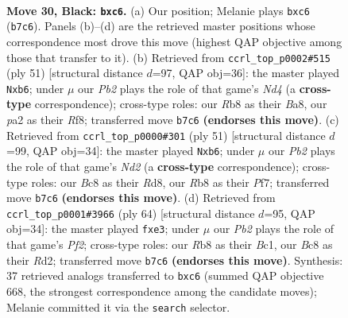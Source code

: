 \documentclass[11pt]{article}
\begin{document}
\clearpage

\begin{figure}[p]\centering
\begin{subfigure}{0.46\textwidth}\centering
\resizebox{\linewidth}{!}{%
\newchessgame
\chessboard[
  setfen={1rbb3k/pp5p/2Q1BppB/8/5P1P/3P1N2/PPP2PK1/4R3 b - - 0 30},
  showmover=false,
  pgfstyle=straightmove, color=movearrow, markmove={b7-c6}
]}
\caption{}
\end{subfigure}\hfill
\begin{subfigure}{0.46\textwidth}\centering
\resizebox{\linewidth}{!}{%
\newchessgame
\chessboard[
  setfen={b4rk1/p4pp1/1Q1bp3/3nN2p/P2PB3/7P/3B1PP1/4R1K1 b - - 0 26},
  showmover=false,
  pgfstyle=straightmove, color=movearrow, markmove={d5-b6}
]}
\caption{}
\end{subfigure}
\\[4pt]
\begin{subfigure}{0.46\textwidth}\centering
\resizebox{\linewidth}{!}{%
\newchessgame
\chessboard[
  setfen={3r2k1/pp1n1ppp/1Qp5/7b/4P3/2N3PP/PP3PB1/2R3K1 b - - 0 26},
  showmover=false,
  pgfstyle=straightmove, color=movearrow, markmove={d7-b6}
]}
\caption{}
\end{subfigure}\hfill
\begin{subfigure}{0.46\textwidth}\centering
\resizebox{\linewidth}{!}{%
\newchessgame
\chessboard[
  setfen={5rk1/4b1p1/2p1pn1p/8/p1p4P/P3q3/KPBR1PP1/2B5 w - - 0 33},
  showmover=false,
  pgfstyle=straightmove, color=movearrow, markmove={f2-e3}
]}
\caption{}
\end{subfigure}
\caption{\textbf{Move 30, Black: \texttt{bxc6}.} (a) Our position; Melanie plays \texttt{bxc6} (\texttt{b7c6}). Panels (b)--(d) are the retrieved master positions whose correspondence most drove this move (highest QAP objective among those that transfer to it). (b) Retrieved from \texttt{ccrl\_top\_p0002\#515} (ply 51) [structural distance $d$=97, QAP obj=36]: the master played \texttt{Nxb6}; under $\mu$ our \emph{Pb2} plays the role of that game's \emph{Nd4} (a \textbf{cross-type} correspondence); cross-type roles: our \emph{R}b8 as their \emph{B}a8, our \emph{p}a2 as their \emph{R}f8; transferred move \texttt{b7c6} \textbf{(endorses this move)}. (c) Retrieved from \texttt{ccrl\_top\_p0000\#301} (ply 51) [structural distance $d$=99, QAP obj=34]: the master played \texttt{Nxb6}; under $\mu$ our \emph{Pb2} plays the role of that game's \emph{Nd2} (a \textbf{cross-type} correspondence); cross-type roles: our \emph{B}c8 as their \emph{R}d8, our \emph{R}b8 as their \emph{P}f7; transferred move \texttt{b7c6} \textbf{(endorses this move)}. (d) Retrieved from \texttt{ccrl\_top\_p0001\#3966} (ply 64) [structural distance $d$=95, QAP obj=34]: the master played \texttt{fxe3}; under $\mu$ our \emph{Pb2} plays the role of that game's \emph{Pf2}; cross-type roles: our \emph{R}b8 as their \emph{B}c1, our \emph{B}c8 as their \emph{R}d2; transferred move \texttt{b7c6} \textbf{(endorses this move)}. Synthesis: 37 retrieved analogs transferred to \texttt{bxc6} (summed QAP objective 668, the strongest correspondence among the candidate moves); Melanie committed it via the \texttt{search} selector.}
\label{fig:thought-m59}
\end{figure}
\end{document}
